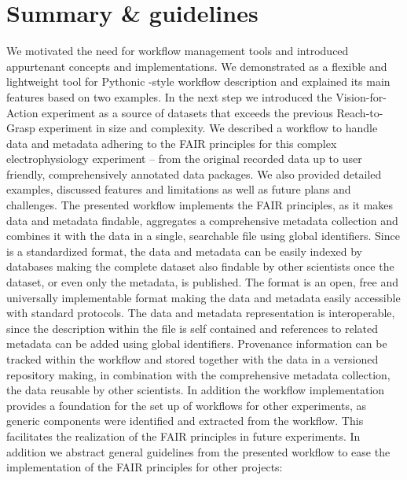 \section{Summary \& guidelines}
\label{sec:guidelines}
We motivated the need for workflow management tools and introduced appurtenant concepts and implementations. We demonstrated  as a flexible and lightweight tool for Pythonic -style workflow description and explained its main features based on two examples. In the next step we introduced the Vision-for-Action experiment as a source of datasets that exceeds the previous Reach-to-Grasp experiment in size and complexity. We described a workflow to handle data and metadata adhering to the FAIR principles for this complex electrophysiology experiment -- from the original recorded data up to user friendly, comprehensively annotated data packages. We also provided detailed examples, discussed features and limitations as well as future plans and challenges.
The presented workflow implements the FAIR principles, as it makes data and metadata findable, aggregates a comprehensive metadata collection and combines it with the data in a single, searchable  file using global identifiers. Since   is a standardized format, the data and metadata can be easily indexed by databases making the complete dataset also findable by other scientists once the dataset, or even only the metadata, is published.
The  format is an open, free and universally implementable format making the data and metadata easily accessible with standard protocols. The data and metadata representation is interoperable, since the description within the  file is self contained and references to related metadata can be added using global identifiers.
Provenance information can be tracked within the workflow and stored together with the data in a versioned repository making, in combination with the comprehensive metadata collection, the data reusable by other scientists.
In addition the workflow implementation provides a foundation for the set up of workflows for other experiments, as generic components were identified and extracted from the workflow. This facilitates the realization of the FAIR principles in future experiments. In addition we abstract general guidelines from the presented workflow to ease the implementation of the FAIR principles for other projects:

